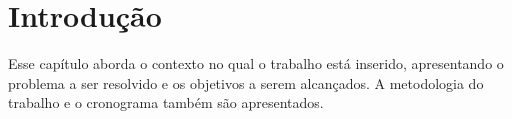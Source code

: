 \chapter[Introdução]{Introdução}

Esse capítulo aborda o contexto no qual o trabalho está inserido, apresentando o
problema a ser resolvido e os objetivos a serem alcançados. A metodologia do trabalho e o
cronograma também são apresentados.







